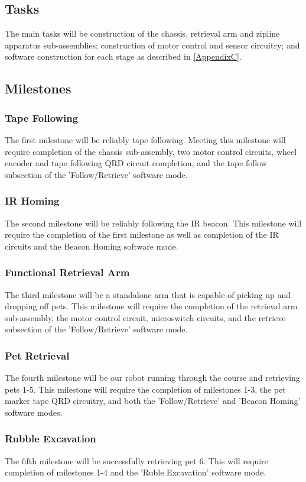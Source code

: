 \documentclass[11pt, oneside]{article} %
\begin{document}
	\subsection{Tasks} 
	The main tasks will be construction of the chassis, retrieval arm and zipline apparatus sub-assemblies; construction of motor control and sensor circuitry; and software construction for each stage as described in \autoref{AppendixC}.

	\subsection{Milestones}
		\subsubsection{Tape Following}
		The first milestone will be reliably tape following. Meeting this milestone will require completion of the chassis sub-assembly, two motor control circuits, wheel encoder and tape following QRD circuit completion, and the tape follow subsection of the 'Follow/Retrieve' software mode.
		\subsubsection{IR Homing}
		The second milestone will be reliably following the IR beacon.  This milestone will require the completion of the first milestone as well as completion of the IR circuits and the Beacon Homing software mode.
		\subsubsection{Functional Retrieval Arm}
		The third milestone will be a standalone arm that is capable of picking up and dropping off pets. This milestone will require the completion of the retrieval arm sub-assembly, the motor control circuit, microswitch circuits, and the retrieve subsection of the 'Follow/Retrieve' software mode.
		\subsubsection{Pet Retrieval}
		The fourth milestone will be our robot running through the course and retrieving pets 1-5. This milestone will require the completion of milestones 1-3, the pet marker tape QRD circuitry, and both the 'Follow/Retrieve' and 'Beacon Homing' software modes.
		\subsubsection{Rubble Excavation}
		The fifth milestone will be successfully retrieving pet 6. This will require completion of milestones 1-4 and the 'Ruble Excavation' software mode.
\end{document}
